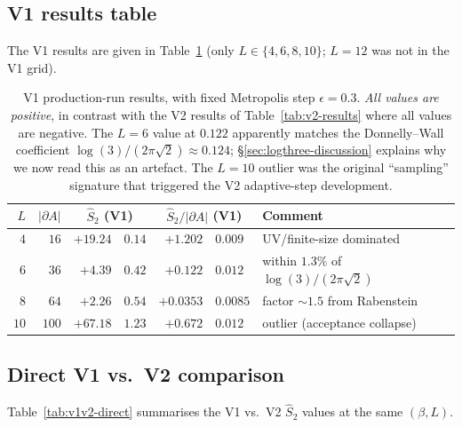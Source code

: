 \documentclass[11pt,a4paper]{article}
\theoremstyle{definition}
\begin{document}
\subsection{V1 results table}

The V1 results are given in Table~\ref{tab:v1-results} (only $L
\in \{4, 6, 8, 10\}$; $L = 12$ was not in the V1 grid).

\begin{table}[t]
\centering
\begin{tabular}{rrr@{$\;\pm\;$}lr@{$\;\pm\;$}ll}
\toprule
$L$ & $|\partial A|$
    & \multicolumn{2}{c}{$\widehat S_2$ (V1)}
    & \multicolumn{2}{c}{$\widehat S_2/|\partial A|$ (V1)}
    & Comment \\
\midrule
$4$  & $16$  & $+19.24$ & $0.14$ & $+1.202$ & $0.009$ & UV/finite-size dominated \\
$6$  & $36$  & $+4.39$  & $0.42$ & $+0.122$ & $0.012$ & within $1.3\%$ of $\log(3)/(2\pi\sqrt 2)$ \\
$8$  & $64$  & $+2.26$  & $0.54$ & $+0.0353$ & $0.0085$ & factor $\sim 1.5$ from Rabenstein \\
$10$ & $100$ & $+67.18$ & $1.23$ & $+0.672$ & $0.012$ & outlier (acceptance collapse) \\
\bottomrule
\end{tabular}
\caption{V1 production-run results, with fixed Metropolis step
$\epsilon = 0.3$. \emph{All values are positive}, in contrast with
the V2 results of Table~\ref{tab:v2-results} where all values are
negative. The $L = 6$ value at $0.122$ apparently matches the
Donnelly--Wall coefficient $\log(3)/(2\pi\sqrt 2) \approx 0.124$;
\S\ref{sec:logthree-discussion} explains why we now read this as an
artefact. The $L = 10$ outlier was the original ``sampling''
signature that triggered the V2 adaptive-step development.}
\label{tab:v1-results}
\end{table}

\subsection{Direct V1 vs.\ V2 comparison}

Table~\ref{tab:v1v2-direct} summarises the V1 vs.\ V2 $\widehat S_2$
values at the same $(\beta, L)$.
\end{document}
